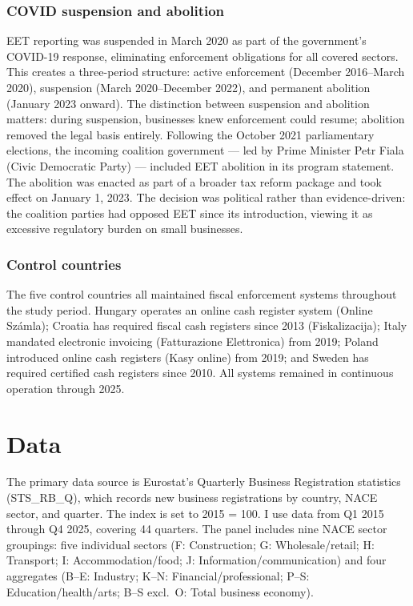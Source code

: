 \documentclass[12pt]{article}
\begin{document}
\subsubsection*{COVID suspension and abolition} EET reporting was suspended in March 2020 as part of the government's COVID-19 response, eliminating enforcement obligations for all covered sectors. This creates a three-period structure: active enforcement (December 2016--March 2020), suspension (March 2020--December 2022), and permanent abolition (January 2023 onward). The distinction between suspension and abolition matters: during suspension, businesses knew enforcement could resume; abolition removed the legal basis entirely. Following the October 2021 parliamentary elections, the incoming coalition government --- led by Prime Minister Petr Fiala (Civic Democratic Party) --- included EET abolition in its program statement. The abolition was enacted as part of a broader tax reform package and took effect on January 1, 2023. The decision was political rather than evidence-driven: the coalition parties had opposed EET since its introduction, viewing it as excessive regulatory burden on small businesses.

\subsubsection*{Control countries} The five control countries all maintained fiscal enforcement systems throughout the study period. Hungary operates an online cash register system (Online Számla); Croatia has required fiscal cash registers since 2013 (Fiskalizacija); Italy mandated electronic invoicing (Fatturazione Elettronica) from 2019; Poland introduced online cash registers (Kasy online) from 2019; and Sweden has required certified cash registers since 2010. All systems remained in continuous operation through 2025.


\section{Data}

The primary data source is Eurostat's Quarterly Business Registration statistics (STS\_RB\_Q), which records new business registrations by country, NACE sector, and quarter. The index is set to 2015 = 100. I use data from Q1 2015 through Q4 2025, covering 44 quarters. The panel includes nine NACE sector groupings: five individual sectors (F: Construction; G: Wholesale/retail; H: Transport; I: Accommodation/food; J: Information/communication) and four aggregates (B--E: Industry; K--N: Financial/professional; P--S: Education/health/arts; B--S excl.\ O: Total business economy).
\end{document}
